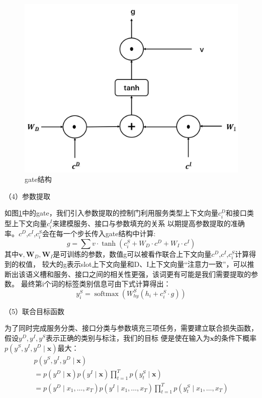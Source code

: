       \begin{figure}[htbp]
        \centering
        \includegraphics[scale=0.3]{./images/gate.jpg}
        \caption{gate结构}
        \label{fig:gate}
      \end{figure}

（4）参数提取

如图\ref{fig:gate}中的gate，我们引入参数提取的控制门利用服务类型上下文向量${c}_{i}^{D}$和接口类型上下文向量${c}_{i}^{I}$来建模服务、接口与参数填充的关系
以期提高参数提取的准确率。${c}^{D}$,${c}^{I}$,${c}_{i}^{S}$会在每一个步长传入gate结构中计算:
\begin{equation}
    g=\sum v \cdot \tanh (c_{i}^{S}+W_D \cdot c^{D}+W_I \cdot c^{I})
  \end{equation}
其中$\mathbf{v},\mathbf{W}_D,\mathbf{W}_I$是可训练的参数，数值g可以被看作联合上下文向量${c}^{D}$,${c}^{I}$,${c}_{i}^{S}$计算得到的权值，
较大的g表示slot上下文向量和D、I上下文向量“注意力一致”，可以推断出该语义槽和服务、接口之间的相关性更强，该词更有可能是我们需要提取的参数。
最终第i个词的标签类别信息可由下式计算得出：
\begin{equation}
    y_{i}^{S}=\operatorname{softmax}\left(W_{h y}^{S}\left(h_{i}+c_{i}^{S} \cdot g\right)\right)
  \end{equation}

（5）联合目标函数

为了同时完成服务分类、接口分类与参数填充三项任务，需要建立联合损失函数，假设$y^D,y^I,y^S$表示正确的类别与标注，我们的目标
便是使在输入为$\mathbf{x}$的条件下概率$p\left(y^{S}, y^{I},y^{D} \mid \mathbf{x}\right)$最大：
\begin{equation}
    \begin{array}{l}
        p\left(y^{S}, y^{I},y^{D} \mid \mathbf{x}\right) \\
        =p\left(y^{D} \mid \mathbf{x}\right) p\left(y^{I} \mid \mathbf{x}\right) \prod_{t=1}^{T} p\left(y_{t}^{S} \mid \mathbf{x}\right) \\
        =p(y^{D} \mid x_{1}, \ldots, x_{T}) p(y^{I} \mid x_{1}, \ldots, x_{T}) \prod_{t=1}^{T} p(y_{t}^{S} \mid x_{1}, \ldots, x_{T})
        \end{array}
    \end{equation}

